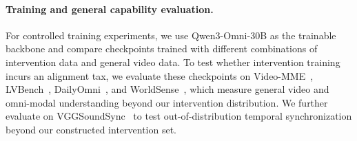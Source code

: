 \paragraph{Training and general capability evaluation.}
For controlled training experiments, we use Qwen3-Omni-30B as the trainable backbone and compare checkpoints trained with different combinations of intervention data and general video data. To test whether intervention training incurs an alignment tax, we evaluate these checkpoints on Video-MME~\cite{DBLP:conf/cvpr/FuDLLRZWZSZCLLZ25}, LVBench~\cite{DBLP:journals/corr/abs-2406-08035}, DailyOmni~\cite{DBLP:journals/corr/abs-2505-17862}, and WorldSense~\cite{DBLP:journals/corr/abs-2502-04326}, which measure general video and omni-modal understanding beyond our intervention distribution. We further evaluate on VGGSoundSync~\cite{Chen21b} to test out-of-distribution temporal synchronization beyond our constructed intervention set.



